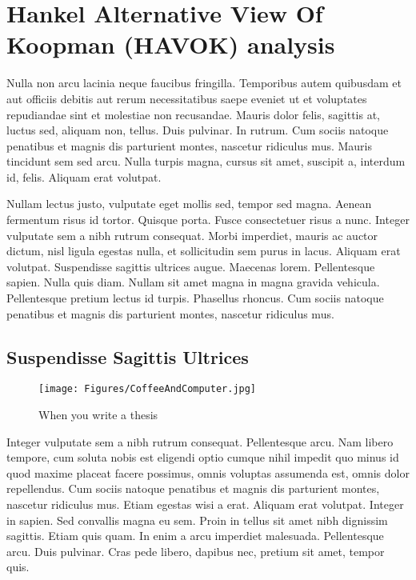 \chapter{Hankel Alternative View Of Koopman (HAVOK) analysis}
Nulla non arcu lacinia neque faucibus fringilla. Temporibus autem quibusdam et aut officiis debitis aut rerum necessitatibus saepe eveniet ut et voluptates repudiandae sint et molestiae non recusandae. Mauris dolor felis, sagittis at, luctus sed, aliquam non, tellus. Duis pulvinar. In rutrum. Cum sociis natoque penatibus et magnis dis parturient montes, nascetur ridiculus mus. Mauris tincidunt sem sed arcu. Nulla turpis magna, cursus sit amet, suscipit a, interdum id, felis. Aliquam erat volutpat.

Nullam lectus justo, vulputate eget mollis sed, tempor sed magna. Aenean fermentum risus id tortor. Quisque porta. Fusce consectetuer risus a nunc. Integer vulputate sem a nibh rutrum consequat. Morbi imperdiet, mauris ac auctor dictum, nisl ligula egestas nulla, et sollicitudin sem purus in lacus. Aliquam erat volutpat. Suspendisse sagittis ultrices augue. Maecenas lorem. Pellentesque sapien. Nulla quis diam. Nullam sit amet magna in magna gravida vehicula. Pellentesque pretium lectus id turpis. Phasellus rhoncus. Cum sociis natoque penatibus et magnis dis parturient montes, nascetur ridiculus mus.


\section{Suspendisse Sagittis Ultrices}

\begin{figure}
	\centering
	\texttt{[image: Figures/CoffeeAndComputer.jpg]}
	\caption{When you write a thesis}
	\label{fig:WritingThesis}
\end{figure}

Integer vulputate sem a nibh rutrum consequat. Pellentesque arcu. Nam libero tempore, cum soluta nobis est eligendi optio cumque nihil impedit quo minus id quod maxime placeat facere possimus, omnis voluptas assumenda est, omnis dolor repellendus. Cum sociis natoque penatibus et magnis dis parturient montes, nascetur ridiculus mus. Etiam egestas wisi a erat. Aliquam erat volutpat. Integer in sapien. Sed convallis magna eu sem. Proin in tellus sit amet nibh dignissim sagittis. Etiam quis quam. In enim a arcu imperdiet malesuada. Pellentesque arcu. Duis pulvinar. Cras pede libero, dapibus nec, pretium sit amet, tempor quis.

